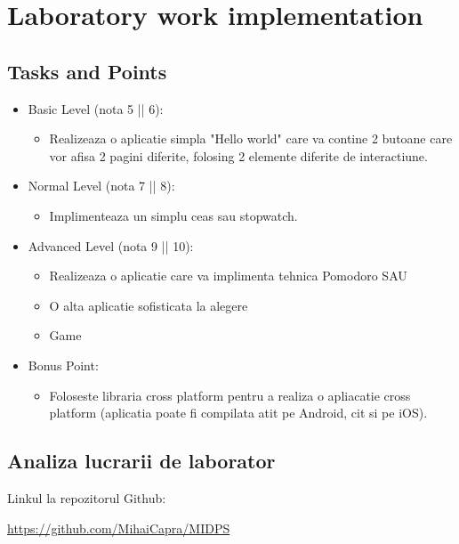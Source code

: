 \section{Laboratory work implementation}

\subsection{Tasks and Points}
\begin{itemize}
	\item Basic Level (nota 5 || 6):
	
	\begin{itemize}
		\item Realizeaza o aplicatie simpla "Hello world" care va contine 2 butoane care vor afisa 2 pagini diferite, folosing 2 elemente diferite de interactiune.
	\end{itemize}
	
	\item Normal Level (nota 7 || 8):
	
	\begin{itemize}
		\item Implimenteaza un simplu ceas sau stopwatch.
	\end{itemize}
	\item Advanced Level (nota 9 || 10):
	
	\begin{itemize}
		\item Realizeaza o aplicatie care va implimenta tehnica Pomodoro SAU
    	\item O alta aplicatie sofisticata la alegere
        \item Game
	\end{itemize}
	\item Bonus Point:
	\begin{itemize}
		\item Foloseste libraria cross platform pentru a realiza o apliacatie cross platform (aplicatia poate fi compilata atit pe Android, cit si pe iOS).
	\end{itemize}
\end{itemize}
    



\subsection{Analiza lucrarii de laborator}

Linkul la repozitorul Github:\\
\begin{center}
\url{https://github.com/MihaiCapra/MIDPS}
\end{center}

